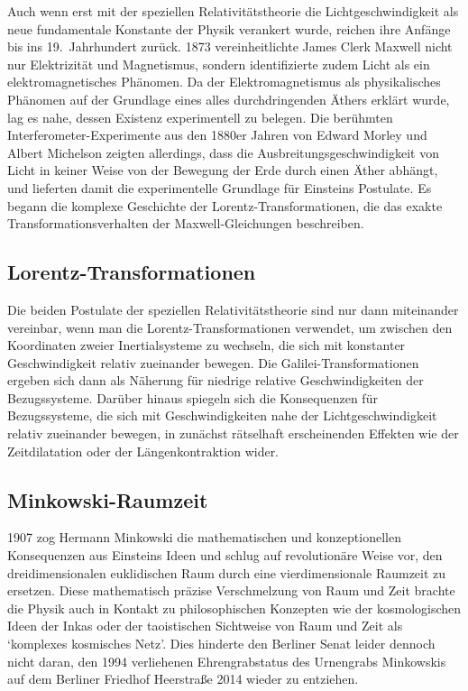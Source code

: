 Auch wenn erst mit der speziellen Relativitätstheorie die Lichtgeschwindigkeit als neue fundamentale Konstante der Physik verankert wurde, reichen ihre Anfänge bis ins 19.\ Jahrhundert zurück. 1873 vereinheitlichte James Clerk Maxwell nicht nur Elektrizität und Magnetismus, sondern identifizierte zudem Licht als ein elektromagnetisches Phänomen. Da der Elektromagnetismus als physikalisches Phänomen auf der Grundlage eines alles durchdringenden Äthers erklärt wurde, lag es nahe, dessen Existenz experimentell zu belegen. Die berühmten Interferometer-Experimente aus den 1880er Jahren von Edward Morley und Albert Michelson zeigten allerdings, dass die Ausbreitungsgeschwindigkeit von Licht in keiner Weise von der Bewegung der Erde durch einen Äther abhängt, und lieferten damit die experimentelle Grundlage für Einsteins Postulate. Es begann die komplexe Geschichte der Lorentz-Transformationen, die das exakte Transformationsverhalten der Maxwell-Gleichungen beschreiben.


\subsection*{Lorentz-Transformationen}

Die beiden Postulate der speziellen Relativitätstheorie sind nur dann miteinander vereinbar, wenn man die Lorentz-Transformationen verwendet, um zwischen den Koordinaten zweier Inertialsysteme zu wechseln, die sich mit konstanter Geschwindigkeit relativ zueinander bewegen. Die Galilei-Transformationen ergeben sich dann als Näherung für niedrige relative Geschwindigkeiten der Bezugssysteme. Darüber hinaus spiegeln sich die Konsequenzen für Bezugssysteme, die sich mit Geschwindigkeiten nahe der  Lichtgeschwindigkeit relativ zueinander bewegen, in zunächst rätselhaft erscheinenden Effekten wie der Zeitdilatation oder der Längenkontraktion wider.


\subsection*{Minkowski-Raumzeit}

1907 zog Hermann Minkowski die mathematischen und konzeptionellen Konsequenzen aus Einsteins Ideen und schlug auf revolutionäre Weise vor, den dreidimensionalen euklidischen Raum durch eine vierdimensionale Raumzeit zu ersetzen. Diese mathematisch präzise Verschmelzung von Raum und Zeit brachte die Physik auch in Kontakt zu philosophischen Konzepten wie der kosmologischen Ideen der Inkas oder der taoistischen Sichtweise von Raum und Zeit als \enquote*{komplexes kosmisches Netz}. Dies hinderte den Berliner Senat leider dennoch nicht daran, den 1994 verliehenen Ehrengrabstatus des Urnengrabs Minkowskis auf dem Berliner Friedhof Heerstraße 2014 wieder zu entziehen.


